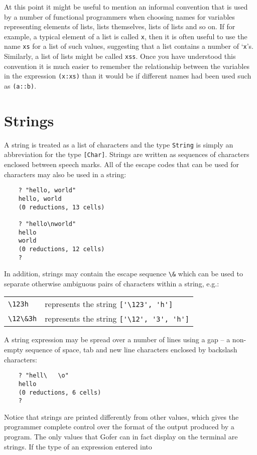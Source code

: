 At this point  it  might  be  useful  to  mention  an  informal
convention that is used by a  number  of  functional  programmers  when
choosing names for variables  representing  elements  of  lists,  lists
themselves, lists of lists and  so  on.   If  for  example,  a  typical
element of a list is called \verb"x", then it is often useful to use the  name
\verb"xs" for a list of such values, suggesting that a list contains a  number
of `\verb"x"'s.  Similarly, a list of lists might be  called  
\verb"xss".   Once  you
have understood this convention it  is  much  easier  to  remember  the
relationship between the variables in the  expression  \verb"(x:xs)"  than  it
would be if different names had been used such as \verb"(a::b)".

\section{Strings}
A string is treated as a list of characters  and  the  type  \verb"String"  is
simply an abbreviation for the type \verb"[Char]".   Strings  are  written  as
sequences of characters enclosed between  speech  marks.   All  of  the
escape codes that can be used for characters may  also  be  used  in  a
string:
\begin{verbatim}
    ? "hello, world"
    hello, world
    (0 reductions, 13 cells)

    ? "hello\nworld"
    hello
    world
    (0 reductions, 12 cells)
    ?
\end{verbatim}
In addition, strings may contain the escape sequence \verb"\&" which can  be
used to separate otherwise  ambiguous  pairs  of  characters  within  a
string, e.g.:
\BQ
\begin{tabular}{ll}
    \verb"\123h"   &represents the string \verb"['\123', 'h']"\\
    \verb"\12\&3h" &represents the string \verb"['\12', '3', 'h']"
\end{tabular}
\EQ
A string expression may be spread over a number of lines using a gap --
a non-empty sequence of space, tab and new line characters enclosed  by
backslash characters:
\begin{verbatim}
    ? "hell\   \o"
    hello
    (0 reductions, 6 cells)
    ? 
\end{verbatim}
Notice that strings are printed  differently from other  values,  which
gives the programmer complete control over the  format  of  the  output
produced by a program.  The only values that Gofer can in fact  display
on the terminal are strings.  If the type of an expression entered into
